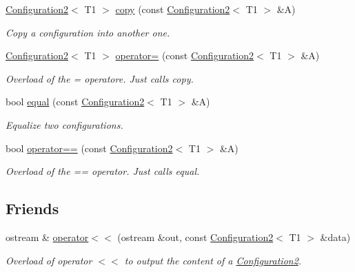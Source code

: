 \begin{DoxyCompactItemize}
\mbox{\hyperlink{class_configuration2}{Configuration2}}$<$ T1 $>$ \mbox{\hyperlink{class_configuration2_a8b0bb9f80a69ff8d70af39adf97ceb46}{copy}} (const \mbox{\hyperlink{class_configuration2}{Configuration2}}$<$ T1 $>$ \&A)
\begin{DoxyCompactList}\small\item\em Copy a configuration into another one. \end{DoxyCompactList}\item 
\mbox{\hyperlink{class_configuration2}{Configuration2}}$<$ T1 $>$ \mbox{\hyperlink{class_configuration2_a9ef2f57ddcc1f0c8117a9ed2f13141aa}{operator=}} (const \mbox{\hyperlink{class_configuration2}{Configuration2}}$<$ T1 $>$ \&A)
\begin{DoxyCompactList}\small\item\em Overload of the = operatore. Just calls {\ttfamily copy}. \end{DoxyCompactList}\item 
bool \mbox{\hyperlink{class_configuration2_a1744207d1346e2ec554795255a58c241}{equal}} (const \mbox{\hyperlink{class_configuration2}{Configuration2}}$<$ T1 $>$ \&A)
\begin{DoxyCompactList}\small\item\em Equalize two configurations. \end{DoxyCompactList}\item 
bool \mbox{\hyperlink{class_configuration2_a7dda6b86ded2376a78a7f3d9f2811740}{operator==}} (const \mbox{\hyperlink{class_configuration2}{Configuration2}}$<$ T1 $>$ \&A)
\begin{DoxyCompactList}\small\item\em Overload of the == operator. Just calls {\ttfamily equal}. \end{DoxyCompactList}\end{DoxyCompactItemize}
\subsection*{Friends}
\begin{DoxyCompactItemize}
\item 
ostream \& \mbox{\hyperlink{class_configuration2_a90aec83947c9087504b4a9b6f0db8205}{operator$<$$<$}} (ostream \&out, const \mbox{\hyperlink{class_configuration2}{Configuration2}}$<$ T1 $>$ \&data)
\begin{DoxyCompactList}\small\item\em Overload of operator $<$$<$ to output the content of a {\ttfamily \mbox{\hyperlink{class_configuration2}{Configuration2}}}. \end{DoxyCompactList}\end{DoxyCompactItemize}



